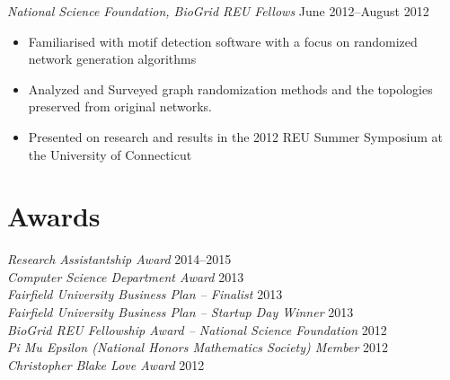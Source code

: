 \documentclass[margin, 10pt]{res}
\begin{document}
\begin{resume}
{\sl National Science Foundation, BioGrid REU Fellows} \hfill  June 2012--August 2012
\begin{itemize} \itemsep -2.5pt %
\item Familiarised with motif detection software with a focus on randomized 
      network generation algorithms
\item Analyzed and Surveyed graph randomization methods and the topologies preserved from
      original networks.
\item Presented on research and results in the 2012 REU Summer Symposium at
      the University of Connecticut
\end{itemize}


\section{Awards} 
{\sl Research Assistantship Award} \hfill{2014--2015} \\
{\sl Computer Science Department Award} \hfill{2013} \\
{\sl Fairfield University Business Plan -- Finalist} \hfill{2013} \\
{\sl Fairfield University Business Plan -- Startup Day Winner} \hfill{2013} \\
{\sl BioGrid REU Fellowship Award -- National Science Foundation} \hfill{2012} \\
{\sl Pi Mu Epsilon (National Honors Mathematics Society) Member} \hfill{2012}\\
{\sl Christopher Blake Love Award} \hfill{2012}


\end{resume}
\end{document}
